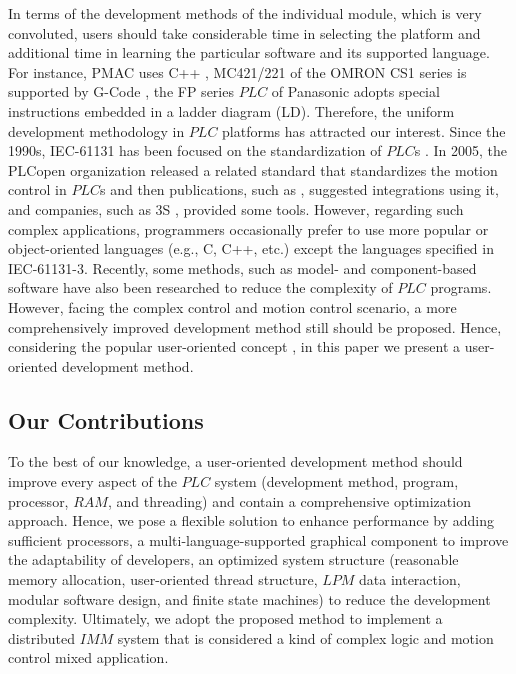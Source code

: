 \documentclass[journal,UTF8]{IEEEtran}
\begin{document}
In terms of the development methods of the individual module, which is very convoluted, users should take considerable time in selecting the platform and additional time in learning the particular software and its supported language. For instance,  PMAC uses C++ \cite{Peng2011Linear,Qian2014A}, MC421/221 of the OMRON CS1 series is supported by G-Code \cite{OMRON2006CS1W}, the FP series $PLC$ of Panasonic adopts special instructions embedded in  a ladder diagram (LD). Therefore, the uniform development methodology in $PLC$ platforms has attracted our interest. Since the 1990s, IEC-61131 has been focused on the standardization of $PLC$s \cite{IEC1993Programmable}. In 2005, the PLCopen organization released a related standard \cite{PLCopen2005Function} that standardizes the motion control in $PLC$s and then publications, such as \cite{S2006Advanced}, suggested integrations using it, and companies, such as 3S \cite{3S2017Logic}, provided some tools. However, regarding such complex applications, programmers occasionally prefer to use more popular or object-oriented languages (e.g., C, C++, etc.) \cite{Bonfe2001Object, Werner2009Object, Basile2013On} except the languages specified in IEC-61131-3. Recently, some methods, such as model- and component-based software \cite{Bonf2013Design, Vyatkin2013Software} have also been researched to reduce the complexity of $PLC$ programs. However, facing the complex control and motion control scenario, a more comprehensively improved development method still should be proposed. Hence, considering the popular user-oriented concept \cite{Verscheure2016User, Choi2017A}, in this paper we present a user-oriented development method.

\subsection{Our Contributions}
To the best of our knowledge, a user-oriented development method should improve every aspect of the $PLC$ system (development method, program, processor, $RAM$, and threading) and contain a comprehensive optimization approach. Hence, we pose a flexible solution to enhance performance by adding sufficient processors, a multi-language-supported graphical component to improve the adaptability of developers, an optimized system structure (reasonable memory allocation, user-oriented thread structure, $LPM$ data interaction, modular software design, and finite state machines) to reduce the development complexity. Ultimately, we adopt the proposed method to implement a distributed $IMM$ system that is considered a kind of complex logic and motion control mixed application.
\end{document}
